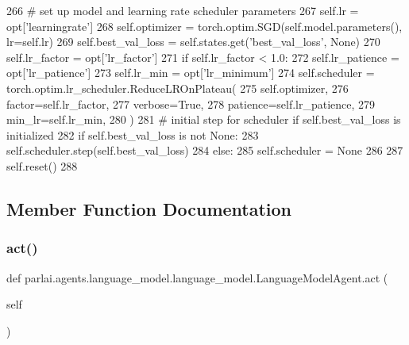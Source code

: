 \begin{DoxyCode}
266         \textcolor{comment}{# set up model and learning rate scheduler parameters}
267         self.lr = opt[\textcolor{stringliteral}{'learningrate'}]
268         self.optimizer = torch.optim.SGD(self.model.parameters(), lr=self.lr)
269         self.best\_val\_loss = self.states.get(\textcolor{stringliteral}{'best\_val\_loss'}, \textcolor{keywordtype}{None})
270         self.lr\_factor = opt[\textcolor{stringliteral}{'lr\_factor'}]
271         \textcolor{keywordflow}{if} self.lr\_factor < 1.0:
272             self.lr\_patience = opt[\textcolor{stringliteral}{'lr\_patience'}]
273             self.lr\_min = opt[\textcolor{stringliteral}{'lr\_minimum'}]
274             self.scheduler = torch.optim.lr\_scheduler.ReduceLROnPlateau(
275                 self.optimizer,
276                 factor=self.lr\_factor,
277                 verbose=\textcolor{keyword}{True},
278                 patience=self.lr\_patience,
279                 min\_lr=self.lr\_min,
280             )
281             \textcolor{comment}{# initial step for scheduler if self.best\_val\_loss is initialized}
282             \textcolor{keywordflow}{if} self.best\_val\_loss \textcolor{keywordflow}{is} \textcolor{keywordflow}{not} \textcolor{keywordtype}{None}:
283                 self.scheduler.step(self.best\_val\_loss)
284         \textcolor{keywordflow}{else}:
285             self.scheduler = \textcolor{keywordtype}{None}
286 
287         self.reset()
288 
\end{DoxyCode}


\subsection{Member Function Documentation}
\mbox{\label{classparlai_1_1agents_1_1language__model_1_1language__model_1_1LanguageModelAgent_a0f8d50e5423b4f34ab5d078d6185e4b2}} 
\subsubsection{\texorpdfstring{act()}{act()}}
{\footnotesize\ttfamily def parlai.\+agents.\+language\+\_\+model.\+language\+\_\+model.\+Language\+Model\+Agent.\+act (\begin{DoxyParamCaption}\item[{}]{self }\end{DoxyParamCaption})}



